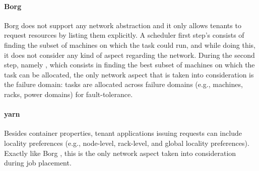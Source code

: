 \paragraph{Borg \texorpdfstring{\cite{borg}}{}}
Borg \cite{borg} does not support any network abstraction and it only allows tenants to request resources by listing them explicitly.
A scheduler first step's consists of finding the subset of machines on which the task could run, and while doing this, it does not consider any kind of aspect regarding the network.
During the second step, namely , which consists in finding the best subset of machines on which the task can be allocated, the only network aspect that is taken into consideration is the failure domain: tasks are allocated across failure domains (e.g., machines, racks, power domains) for fault-tolerance.



\paragraph{\glsdesc{yarn}}
Besides container properties, tenant applications issuing requests can include locality preferences (e.g., node-level, rack-level, and global locality preferences).
Exactly like Borg \cite{borg}, this is the only network aspect taken into consideration during job placement.